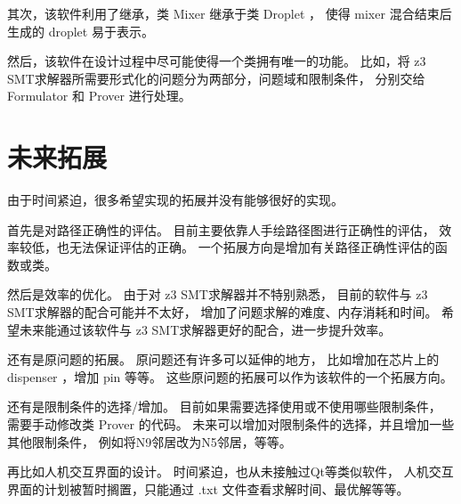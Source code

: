 \documentclass[UTF8, a4paper, titlepage]{ctexart}
\begin{document}
其次，该软件利用了继承，类 Mixer 继承于类 Droplet ，%
使得 mixer 混合结束后生成的 droplet 易于表示。%

然后，该软件在设计过程中尽可能使得一个类拥有唯一的功能。%
比如，将 z3 SMT求解器所需要形式化的问题分为两部分，问题域和限制条件，%
分别交给 Formulator 和 Prover 进行处理。%

\section{未来拓展}
由于时间紧迫，很多希望实现的拓展并没有能够很好的实现。%

首先是对路径正确性的评估。%
目前主要依靠人手绘路径图进行正确性的评估，%
效率较低，也无法保证评估的正确。%
一个拓展方向是增加有关路径正确性评估的函数或类。%

然后是效率的优化。%
由于对 z3 SMT求解器并不特别熟悉，%
目前的软件与 z3 SMT求解器的配合可能并不太好，%
增加了问题求解的难度、内存消耗和时间。%
希望未来能通过该软件与 z3 SMT求解器更好的配合，进一步提升效率。%

还有是原问题的拓展。%
原问题还有许多可以延伸的地方，%
比如增加在芯片上的 dispenser ，增加 pin 等等。%
这些原问题的拓展可以作为该软件的一个拓展方向。%

还有是限制条件的选择/增加。%
目前如果需要选择使用或不使用哪些限制条件，%
需要手动修改类 Prover 的代码。%
未来可以增加对限制条件的选择，并且增加一些其他限制条件，%
例如将N9邻居改为N5邻居，等等。%

再比如人机交互界面的设计。%
时间紧迫，也从未接触过Qt等类似软件，%
人机交互界面的计划被暂时搁置，只能通过 .txt 文件查看求解时间、最优解等等。%
\end{document}
